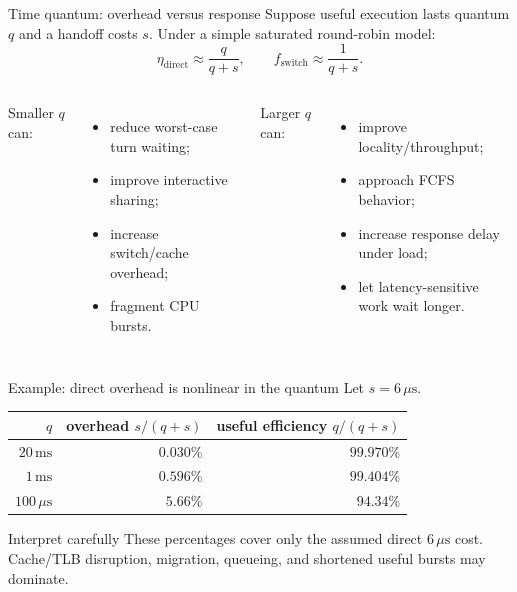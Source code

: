 \documentclass[aspectratio=169,11pt]{beamer}
\begin{document}
\begin{frame}{Time quantum: overhead versus response}
  Suppose useful execution lasts quantum $q$ and a handoff costs $s$. Under a simple saturated round-robin model:
  \[
    \eta_{\text{direct}} \approx \frac{q}{q+s},
    \qquad
    f_{\text{switch}} \approx \frac{1}{q+s}.
  \]
  \begin{columns}[T,onlytextwidth]
      Smaller $q$ can:
      \begin{itemize}
        \item reduce worst-case turn waiting;
        \item improve interactive sharing;
        \item increase switch/cache overhead;
        \item fragment CPU bursts.
      \end{itemize}
      Larger $q$ can:
      \begin{itemize}
        \item improve locality/throughput;
        \item approach FCFS behavior;
        \item increase response delay under load;
        \item let latency-sensitive work wait longer.
      \end{itemize}
  \end{columns}
\end{frame}

\begin{frame}{Example: direct overhead is nonlinear in the quantum}
  Let $s=6\,\mu\mathrm{s}$.
  \begin{center}
  \begin{tabular}{@{}rrr@{}}
    \toprule
    $q$ & overhead $s/(q+s)$ & useful efficiency $q/(q+s)$ \\
    \midrule
    $20\,\mathrm{ms}$ & $0.030\%$ & $99.970\%$ \\
    $1\,\mathrm{ms}$ & $0.596\%$ & $99.404\%$ \\
    $100\,\mu\mathrm{s}$ & $5.66\%$ & $94.34\%$ \\
    \bottomrule
  \end{tabular}
  \end{center}
  \begin{alertblock}{Interpret carefully}
    These percentages cover only the assumed direct $6\,\mu\mathrm{s}$ cost. Cache/TLB disruption, migration, queueing, and shortened useful bursts may dominate.
  \end{alertblock}
\end{frame}
\end{document}
